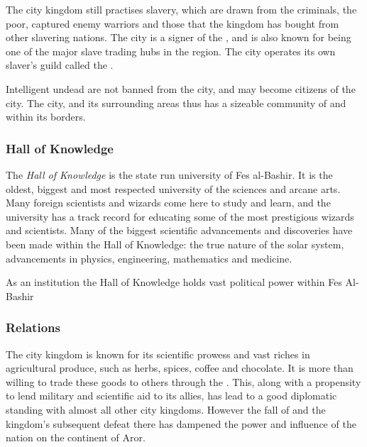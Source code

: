 The city kingdom still practises slavery, which are drawn from the criminals,
the poor, captured enemy warriors and those that the kingdom has bought from
other slavering nations. The city is a signer of the , and is also known for being one of the major slave trading hubs in
the region. The city operates its own slaver's guild called the
.

Intelligent undead are not banned from the city, and may become citizens of
the city. The city, and its surrounding areas thus has a sizeable community of
 and  within its borders.

\subsubsection{Hall of Knowledge}
\label{sec:Hall of Knowledge}

The \emph{Hall of Knowledge} is the state run university of Fes al-Bashir. It
is the oldest, biggest and most respected university of the sciences and
arcane arts.  Many foreign scientists and wizards come here to study and
learn, and the university has a track record for educating some of the most
prestigious wizards and scientists. Many of the biggest scientific
advancements and discoveries have been made within the Hall of Knowledge: the
true nature of the solar system, advancements in physics, engineering,
mathematics and medicine.

As an institution the Hall of Knowledge holds vast political power within
Fes Al-Bashir

\subsubsection{Relations}

The city kingdom is known for its scientific prowess and vast riches in
agricultural produce, such as herbs, spices, coffee and chocolate. It is more
than willing to trade these goods to others through the . This, along with a propensity to lend military and
scientific aid to its allies, has lead to a good diplomatic standing with
almost all other city kingdoms. However the fall of  and
the kingdom's subsequent defeat there has dampened the power and influence of
the nation on the continent of Aror.
